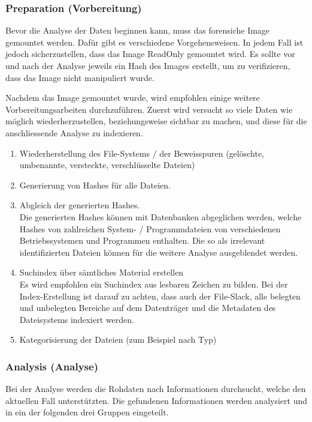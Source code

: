 \subsubsection{Preparation (Vorbereitung)}
Bevor die Analyse der Daten beginnen kann, muss das forensiche Image gemountet werden. Dafür gibt es verschiedene Vorgehensweisen. In jedem Fall ist jedoch sicherzustellen, dass das Image ReadOnly gemountet wird. Es sollte vor und nach der Analyse jeweils ein Hash des Images erstellt, um zu verifizieren, dass das Image nicht manipuliert wurde.

Nachdem das Image gemountet wurde, wird empfohlen einige weitere Vorbereitungsarbeiten durchzuführen. Zuerst wird versucht so viele Daten wie möglich wiederherzustellen, beziehungsweise sichtbar zu machen, und diese für die anschliessende Analyse zu indexieren.

\begin{enumerate}
\item Wiederherstellung des File-Systems / der Beweisspuren (gelöschte, umbenannte, versteckte, verschlüsselte Dateien)
\item Generierung von Hashes für alle Dateien.
\item Abgleich der generierten Hashes. \\
Die generierten Hashes können mit Datenbanken abgeglichen werden, welche Hashes von zahlreichen System- / Programmdateien von verschiedenen Betriebssystemen und Programmen enthalten. Die so als irrelevant identifizierten Dateien können für die weitere Analyse ausgeblendet werden.
\item Suchindex über sämtliches Material erstellen \\
Es wird empfohlen ein Suchindex aus lesbaren Zeichen zu bilden. Bei der Index-Erstellung ist darauf zu achten, dass auch der File-Slack, alle belegten und unbelegten Bereiche auf dem Datenträger und die Metadaten des Dateisystems indexiert werden.
\item Kategorisierung der Dateien (zum Beispiel nach Typ)
\end{enumerate}



\subsubsection{Analysis (Analyse)}
Bei der Analyse werden die Rohdaten nach Informationen durchsucht, welche den aktuellen Fall unterstützten. Die gefundenen Informationen werden analysiert und in ein der folgenden drei Gruppen eingeteilt.

